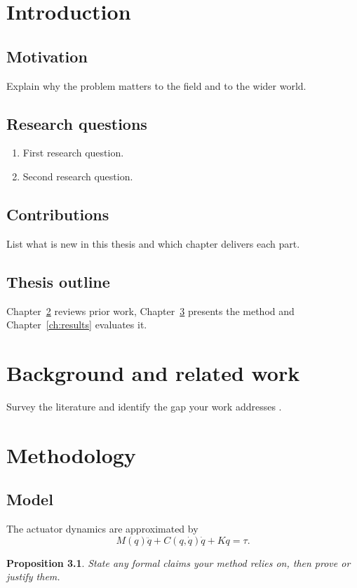 \documentclass[12pt,a4paper,oneside]{report}
\newtheorem{proposition}{Proposition}[chapter]
\begin{document}
\cleardoublepage
{}

\chapter{Introduction}
\label{ch:intro}
\section{Motivation}
Explain why the problem matters to the field and to the wider world.
\section{Research questions}
\begin{enumerate}
  \item First research question.
  \item Second research question.
\end{enumerate}
\section{Contributions}
List what is new in this thesis and which chapter delivers each part.
\section{Thesis outline}
Chapter~\ref{ch:background} reviews prior work, Chapter~\ref{ch:method} presents the method and Chapter~\ref{ch:results} evaluates it.

\chapter{Background and related work}
\label{ch:background}
Survey the literature and identify the gap your work addresses \cite{ref1}.

\chapter{Methodology}
\label{ch:method}
\section{Model}
The actuator dynamics are approximated by
\begin{equation}
  M(q)\ddot{q} + C(q,\dot{q})\dot{q} + K q = \tau .
  \label{eq:dynamics}
\end{equation}
\begin{proposition}
State any formal claims your method relies on, then prove or justify them.
\end{proposition}
\end{document}
